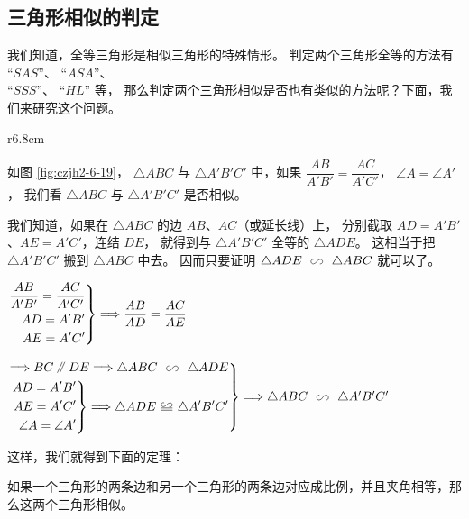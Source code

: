 \subsection{三角形相似的判定}\label{subsec:czjh2-6-7}
\begin{enhancedline}

我们知道，全等三角形是相似三角形的特殊情形。
判定两个三角形全等的方法有 “$SAS$”、 “$ASA$”、\\ “$SSS$”、 “$HL$” 等，
那么判定两个三角形相似是否也有类似的方法呢？下面，我们来研究这个问题。

\begin{wrapfigure}[6]{r}{6.8cm}
    \centering
    
    \caption{}\label{fig:czjh2-6-19}
\end{wrapfigure}

如图 \ref{fig:czjh2-6-19}， $\triangle ABC$ 与 $\triangle A'B'C'$ 中，如果
$\dfrac{AB}{A'B'} = \dfrac{AC}{A'C'}$， $\angle A = \angle A'$，
我们看 $\triangle ABC$ 与 $\triangle A'B'C'$ 是否相似。

我们知道，如果在 $\triangle ABC$ 的边 $AB$、$AC$（或延长线）上，
分别截取 $AD = A'B'$、$AE = A'C'$，连结 $DE$，
就得到与 $\triangle A'B'C'$ 全等的 $\triangle ADE$。
这相当于把 $\triangle A'B'C'$ 搬到 $\triangle ABC$ 中去。
因而只要证明 $\triangle ADE \xiangsi \triangle ABC$ 就可以了。

$\left.\begin{aligned}
    \dfrac{AB}{A'B'} = \dfrac{AC}{A'C'} \\
    AD = A'B' \\
    AE = A'C'
\end{aligned}\right\} \Longrightarrow \dfrac{AB}{AD} = \dfrac{AC}{AE}$

\qquad $\left.\begin{aligned}
    \tuichu BC \pingxing DE \tuichu \triangle ABC \xiangsi \triangle ADE \\
    \left.\begin{aligned}
        AD = A'B' \\
        AE = A'C' \\
        \angle A = \angle A'
    \end{aligned}\right\} \tuichu \triangle ADE \quandeng \triangle A'B'C'
\end{aligned}\right\} \tuichu \triangle ABC \xiangsi \triangle A'B'C'$


这样，我们就得到下面的定理：

\begin{dingli}[三角形相似的判定定理1]
    如果一个三角形的两条边和另一个三角形的两条边对应成比例，并且夹角相等，那么这两个三角形相似。
\end{dingli}


\end{enhancedline}
